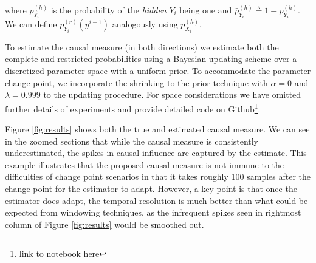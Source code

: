 \noindent where $p^{(h)}_{Y_i}$ is the probability of the \emph{hidden} $Y_i$ being one and $\bar{p}^{(h)}_{Y_i} \triangleq 1-p^{(h)}_{Y_i}$. We can define $p_{Y_i}^{(r)}(y^{i-1})$ analogously using $p^{(h)}_{X_i}$.

To estimate the causal measure (in both directions) we estimate both the complete and restricted probabilities using a Bayesian updating scheme over a discretized parameter space with a uniform prior. To accommodate the parameter change point, we incorporate the shrinking to the prior technique with $\alpha=0$ and $\lambda=0.999$ \cite{sancetta2012universality} to the updating procedure. For space considerations we have omitted further details of experiments and provide detailed code on Github\footnote{link to notebook here}.

Figure \ref{fig:results} shows both the true and estimated causal measure. We can see in the zoomed sections that while the causal measure is consistently underestimated, the spikes in causal influence are captured by the estimate. This example illustrates that the proposed causal measure is not immune to the difficulties of change point scenarios in that it takes roughly 100 samples after the change point for the estimator to adapt. However, a key point is that once the estimator does adapt, the temporal resolution is much better than what could be expected from windowing techniques, as the infrequent spikes seen in rightmost column of Figure \ref{fig:results} would be smoothed out.

